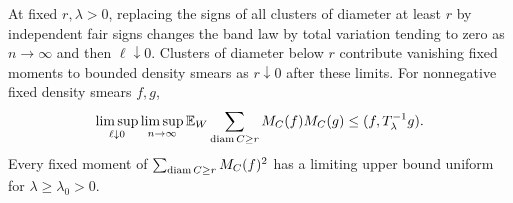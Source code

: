 \begin{lemma}\label{lem:pins-resampling}
At fixed \(r,\lambda>0\), replacing the signs of all clusters
of diameter at least \(r\) by independent fair signs changes
the band law by total variation tending to zero as
\(n\to\infty\) and then \(\ell\downarrow0\).
Clusters of diameter below \(r\) contribute vanishing fixed
moments to bounded density smears as \(r\downarrow0\) after
these limits. For nonnegative fixed density smears \(f,g\),
\begin{equation}
 \limsup_{\ell\downarrow0}\limsup_{n\to\infty}
 \mathbb E_W\sum_{\operatorname{diam} C\ge r}M_C(f)M_C(g)
       \le (f,T_\lambda^{-1}g).
 \label{eq:pins-cross}
\end{equation}
Every fixed moment of \(\sum_{\operatorname{diam} C\ge r}M_C(f)^2\)
has a limiting upper bound uniform for
\(\lambda\ge\lambda_0>0\).
\end{lemma}

